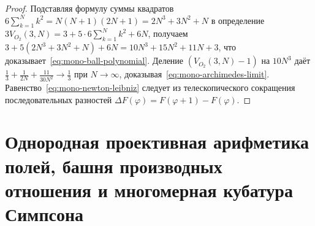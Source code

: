 \begin{proof}
Подставляя формулу суммы квадратов $6\sum_{k=1}^N k^2 = N(N+1)(2N+1) = 2N^3 + 3N^2 + N$ в определение $3 V_{O_2}(3, N) = 3 + 5\cdot 6\sum_{k=1}^N k^2 + 6N$, получаем $3 + 5(2N^3 + 3N^2 + N) + 6N = 10N^3 + 15N^2 + 11N + 3$, что доказывает~\eqref{eq:mono-ball-polynomial}. Деление $(V_{O_2}(3,N) - 1)$ на $10N^3$ даёт $\frac{1}{3} + \frac{1}{2N} + \frac{11}{30N^2} \to \frac{1}{3}$ при $N \to \infty$, доказывая~\eqref{eq:mono-archimedes-limit}. Равенство~\eqref{eq:mono-newton-leibniz} следует из телескопического сокращения последовательных разностей $\Delta F(\varphi) = F(\varphi+1) - F(\varphi)$.
\end{proof}

\section{Однородная проективная арифметика полей, башня производных отношения и многомерная кубатура Симпсона}

